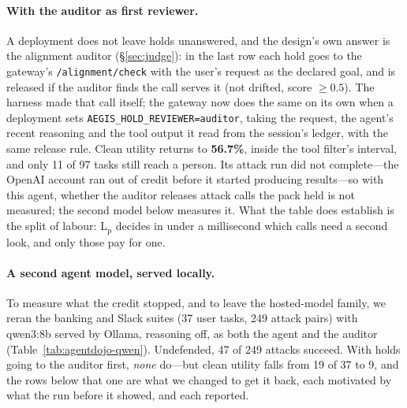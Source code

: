 \documentclass[sigconf,nonacm]{acmart}
\begin{document}
\paragraph{With the auditor as first reviewer.} A deployment does not
leave holds unanswered, and the design's own answer is the alignment auditor (\S\ref{sec:judge}): in the last row each hold goes to the gateway's \texttt{/alignment/check} with the user's request as the declared goal, and is released if the auditor finds the call serves it (not drifted, score $\geq 0.5$). The harness made that call itself; the gateway now does the same on its own when a deployment sets \texttt{AEGIS\_HOLD\_REVIEWER=auditor}, taking the request, the agent's recent reasoning and the tool output it read from the session's ledger, with the same release rule.
Clean utility returns to \textbf{56.7\%}, inside the tool filter's
interval, and only 11 of 97 tasks still reach a person. Its attack run
did not complete---the OpenAI account ran out of credit before it
started producing results---so with this agent, whether the auditor
releases attack calls the pack held is not measured; the second model
below measures it. What the table does establish is the split of
labour: L$_\mathrm{p}$ decides in under a millisecond which calls need a
second look, and only those pay for one.



\paragraph{A second agent model, served locally.} To measure what the
credit stopped, and to leave the hosted-model family, we reran the
banking and Slack suites (37 user tasks, 249 attack pairs) with
qwen3:8b served by Ollama, reasoning off, as both the agent and the
auditor (Table~\ref{tab:agentdojo-qwen}). Undefended, 47 of 249 attacks
succeed. With holds going to the auditor first, \emph{none} do---but
clean utility falls from 19 of 37 to 9, and the rows below that one are
what we changed to get it back, each motivated by what the run before it
showed, and each reported.
\end{document}
